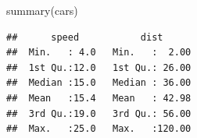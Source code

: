 \documentclass[twocolumn]{article}
\newenvironment{Shaded}{}{}
\newcommand{\KeywordTok}[1]{\textcolor[rgb]{0.00,0.00,1.00}{#1}}
\newcommand{\NormalTok}[1]{#1}
\begin{document}
\begin{Shaded}
\begin{Highlighting}[]
\KeywordTok{summary}\NormalTok{(cars)}
\end{Highlighting}
\end{Shaded}

\begin{verbatim}
##      speed           dist       
##  Min.   : 4.0   Min.   :  2.00  
##  1st Qu.:12.0   1st Qu.: 26.00  
##  Median :15.0   Median : 36.00  
##  Mean   :15.4   Mean   : 42.98  
##  3rd Qu.:19.0   3rd Qu.: 56.00  
##  Max.   :25.0   Max.   :120.00
\end{verbatim}
\end{document}
